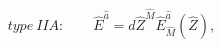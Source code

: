 \begin{equation}
\label{bEIIA}
type ~IIA: \qquad 
\hat{E}^{ {\hat{a}}}= d\hat{Z}^{ {\hat{M}}}
\hat{E}_{ {\hat{M}}}^{ {\hat{a}}}(\hat{Z}),
\end{equation}


